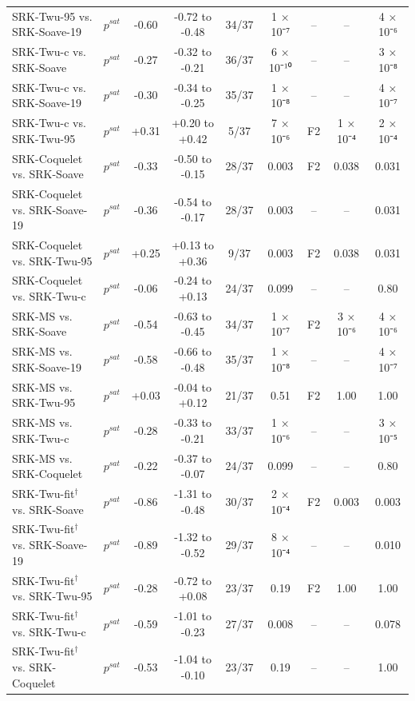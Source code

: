 \begin{table}[H]
\begin{tabular}{llccccccc}
SRK-Twu-95 vs. SRK-Soave-19 & $p^{sat}$ & -0.60 & -0.72 to -0.48 & 34/37 & 1 × 10⁻⁷ & -- & -- & 4 × 10⁻⁶ \\
SRK-Twu-c vs. SRK-Soave & $p^{sat}$ & -0.27 & -0.32 to -0.21 & 36/37 & 6 × 10⁻¹⁰ & -- & -- & 3 × 10⁻⁸ \\
SRK-Twu-c vs. SRK-Soave-19 & $p^{sat}$ & -0.30 & -0.34 to -0.25 & 35/37 & 1 × 10⁻⁸ & -- & -- & 4 × 10⁻⁷ \\
SRK-Twu-c vs. SRK-Twu-95 & $p^{sat}$ & +0.31 & +0.20 to +0.42 & 5/37 & 7 × 10⁻⁶ & F2 & 1 × 10⁻⁴ & 2 × 10⁻⁴ \\
SRK-Coquelet vs. SRK-Soave & $p^{sat}$ & -0.33 & -0.50 to -0.15 & 28/37 & 0.003 & F2 & 0.038 & 0.031 \\
SRK-Coquelet vs. SRK-Soave-19 & $p^{sat}$ & -0.36 & -0.54 to -0.17 & 28/37 & 0.003 & -- & -- & 0.031 \\
SRK-Coquelet vs. SRK-Twu-95 & $p^{sat}$ & +0.25 & +0.13 to +0.36 & 9/37 & 0.003 & F2 & 0.038 & 0.031 \\
SRK-Coquelet vs. SRK-Twu-c & $p^{sat}$ & -0.06 & -0.24 to +0.13 & 24/37 & 0.099 & -- & -- & 0.80 \\
SRK-MS vs. SRK-Soave & $p^{sat}$ & -0.54 & -0.63 to -0.45 & 34/37 & 1 × 10⁻⁷ & F2 & 3 × 10⁻⁶ & 4 × 10⁻⁶ \\
SRK-MS vs. SRK-Soave-19 & $p^{sat}$ & -0.58 & -0.66 to -0.48 & 35/37 & 1 × 10⁻⁸ & -- & -- & 4 × 10⁻⁷ \\
SRK-MS vs. SRK-Twu-95 & $p^{sat}$ & +0.03 & -0.04 to +0.12 & 21/37 & 0.51 & F2 & 1.00 & 1.00 \\
SRK-MS vs. SRK-Twu-c & $p^{sat}$ & -0.28 & -0.33 to -0.21 & 33/37 & 1 × 10⁻⁶ & -- & -- & 3 × 10⁻⁵ \\
SRK-MS vs. SRK-Coquelet & $p^{sat}$ & -0.22 & -0.37 to -0.07 & 24/37 & 0.099 & -- & -- & 0.80 \\
SRK-Twu-fit$^{\dagger}$ vs. SRK-Soave & $p^{sat}$ & -0.86 & -1.31 to -0.48 & 30/37 & 2 × 10⁻⁴ & F2 & 0.003 & 0.003 \\
SRK-Twu-fit$^{\dagger}$ vs. SRK-Soave-19 & $p^{sat}$ & -0.89 & -1.32 to -0.52 & 29/37 & 8 × 10⁻⁴ & -- & -- & 0.010 \\
SRK-Twu-fit$^{\dagger}$ vs. SRK-Twu-95 & $p^{sat}$ & -0.28 & -0.72 to +0.08 & 23/37 & 0.19 & F2 & 1.00 & 1.00 \\
SRK-Twu-fit$^{\dagger}$ vs. SRK-Twu-c & $p^{sat}$ & -0.59 & -1.01 to -0.23 & 27/37 & 0.008 & -- & -- & 0.078 \\
SRK-Twu-fit$^{\dagger}$ vs. SRK-Coquelet & $p^{sat}$ & -0.53 & -1.04 to -0.10 & 23/37 & 0.19 & -- & -- & 1.00 \\

\end{tabular}
\end{table}
